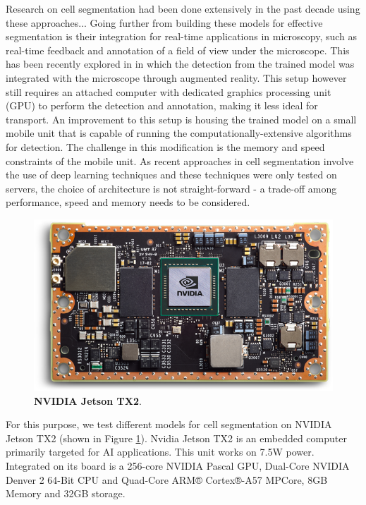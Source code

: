 \documentclass[journal]{IEEEtran}
\begin{document}
Research on cell segmentation had been done extensively in the past decade using these approaches...
Going further from building these models for effective segmentation is their integration for real-time applications in microscopy, such as real-time feedback and annotation of a field of view under the microscope. This has been recently explored in \cite{Waithe544833} in which the detection from the trained model was integrated with the microscope through augmented reality. This setup however still requires an attached computer with dedicated graphics processing unit (GPU) to perform the detection and annotation, making it less ideal for transport. %
An improvement to this setup is housing the trained model on a small mobile unit that is capable of running the computationally-extensive algorithms for detection. The challenge in this modification is the memory and speed constraints of the mobile unit. As recent approaches in cell segmentation involve the use of deep learning techniques and these techniques were only tested on servers, the choice of architecture is not straight-forward - a trade-off among performance, speed and memory needs to be considered.

\begin{figure}
\includegraphics[width=\linewidth]{jetson.png}
\caption{\textbf{NVIDIA Jetson TX2}.}
\label{fig:jetson}
\end{figure}
For this purpose, we test different models for cell segmentation on NVIDIA Jetson TX2 \cite{jetson} (shown in Figure \ref{fig:jetson}). Nvidia Jetson TX2 is an embedded computer primarily targeted for AI applications. This unit works on 7.5W power. Integrated on its board is a 256-core NVIDIA Pascal GPU, Dual-Core NVIDIA Denver 2 64-Bit CPU and Quad-Core ARM® Cortex®-A57 MPCore, 8GB Memory and 32GB storage.
\end{document}

